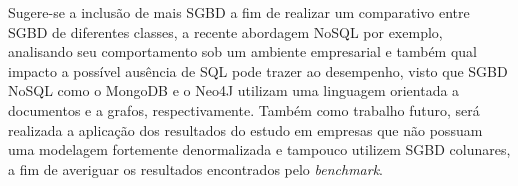 \documentclass[conference]{IEEEtran}
\begin{document}
Sugere-se a inclusão de mais SGBD a fim de realizar um comparativo entre SGBD de diferentes classes, a recente abordagem NoSQL por exemplo, analisando seu comportamento sob um ambiente empresarial e também qual impacto a possível ausência de SQL pode trazer ao desempenho, visto que SGBD NoSQL como o MongoDB e o Neo4J utilizam uma linguagem orientada a documentos e a grafos, respectivamente. Também como trabalho futuro, será realizada a aplicação dos resultados do estudo em empresas que não possuam uma modelagem fortemente denormalizada e tampouco utilizem SGBD colunares, a fim de averiguar os resultados encontrados pelo \textit{benchmark}.


%
%



%
%
\end{document}
